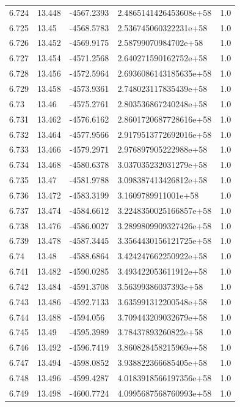 \begin{tabular}{lllll}
6.724 & 13.448 & -4567.2393 & 2.4865141426453608e+58 & 1.0 \\
6.725 & 13.45 & -4568.5783 & 2.536745060322231e+58 & 1.0 \\
6.726 & 13.452 & -4569.9175 & 2.58799070984702e+58 & 1.0 \\
6.727 & 13.454 & -4571.2568 & 2.640271590162752e+58 & 1.0 \\
6.728 & 13.456 & -4572.5964 & 2.6936086143185635e+58 & 1.0 \\
6.729 & 13.458 & -4573.9361 & 2.748023117835439e+58 & 1.0 \\
6.73 & 13.46 & -4575.2761 & 2.803536867240248e+58 & 1.0 \\
6.731 & 13.462 & -4576.6162 & 2.8601720687728616e+58 & 1.0 \\
6.732 & 13.464 & -4577.9566 & 2.9179513772692016e+58 & 1.0 \\
6.733 & 13.466 & -4579.2971 & 2.976897905222988e+58 & 1.0 \\
6.734 & 13.468 & -4580.6378 & 3.037035232031279e+58 & 1.0 \\
6.735 & 13.47 & -4581.9788 & 3.098387413426812e+58 & 1.0 \\
6.736 & 13.472 & -4583.3199 & 3.1609789911001e+58 & 1.0 \\
6.737 & 13.474 & -4584.6612 & 3.2248350025166857e+58 & 1.0 \\
6.738 & 13.476 & -4586.0027 & 3.2899809909327426e+58 & 1.0 \\
6.739 & 13.478 & -4587.3445 & 3.3564430156121725e+58 & 1.0 \\
6.74 & 13.48 & -4588.6864 & 3.424247662250922e+58 & 1.0 \\
6.741 & 13.482 & -4590.0285 & 3.493422053611912e+58 & 1.0 \\
6.742 & 13.484 & -4591.3708 & 3.56399386037393e+58 & 1.0 \\
6.743 & 13.486 & -4592.7133 & 3.635991312200548e+58 & 1.0 \\
6.744 & 13.488 & -4594.056 & 3.709443209032679e+58 & 1.0 \\
6.745 & 13.49 & -4595.3989 & 3.78437893260822e+58 & 1.0 \\
6.746 & 13.492 & -4596.7419 & 3.860828458215969e+58 & 1.0 \\
6.747 & 13.494 & -4598.0852 & 3.938822366685405e+58 & 1.0 \\
6.748 & 13.496 & -4599.4287 & 4.0183918566197356e+58 & 1.0 \\
6.749 & 13.498 & -4600.7724 & 4.0995687568760993e+58 & 1.0 \\

\end{tabular}
